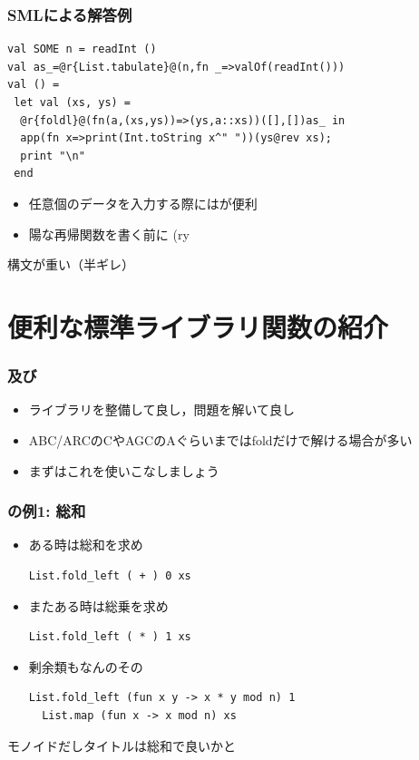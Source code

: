 \documentclass[dvipdfmx,cjk,xcolor=dvipsnames,envcountsect,notheorems,12pt]{beamer}
\theoremstyle{definition}
\begin{document}
\begin{frame}[fragile]
	\frametitle{SMLによる解答例}
	\begin{lstlisting}
val SOME n = readInt ()
val as_=@r{List.tabulate}@(n,fn _=>valOf(readInt()))
val () =
 let val (xs, ys) =
  @r{foldl}@(fn(a,(xs,ys))=>(ys,a::xs))([],[])as_ in
  app(fn x=>print(Int.toString x^" "))(ys@rev xs);
  print "\n"
 end
\end{lstlisting}
	\begin{itemize}
		\item 任意個のデータを入力する際にはが便利
		\item 陽な再帰関数を書く前に (ry
	\end{itemize}
	\begin{flushright}
		構文が重い（半ギレ）
	\end{flushright}
\end{frame}

\section{便利な標準ライブラリ関数の紹介}

\begin{frame}
	\frametitle{及び}
	\begin{itemize}
		\item ライブラリを整備して良し，問題を解いて良し
		\item ABC/ARCのCやAGCのAぐらいまではfoldだけで解ける場合が多い
		\item まずはこれを使いこなしましょう
	\end{itemize}
\end{frame}

\begin{frame}[fragile]
	\frametitle{の例1: 総和}
	\begin{itemize}
		\item ある時は総和を求め
	\begin{lstlisting}
List.fold_left ( + ) 0 xs
\end{lstlisting}
	\vfill
		\item またある時は総乗を求め
	\begin{lstlisting}
List.fold_left ( * ) 1 xs
\end{lstlisting}
	\vfill
		\item 剰余類もなんのその
	\begin{lstlisting}
List.fold_left (fun x y -> x * y mod n) 1
  List.map (fun x -> x mod n) xs
\end{lstlisting}
	\end{itemize}
	\begin{flushright}
		モノイドだしタイトルは総和で良いかと
	\end{flushright}
\end{frame}
\end{document}
